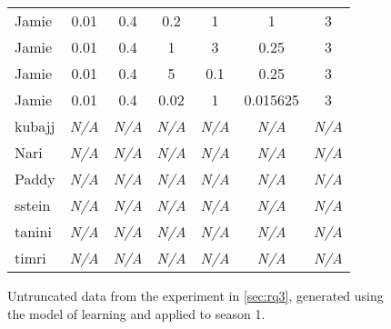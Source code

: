\begin{figure}[h]
\begin{tabular}{@{}l c c c c c c@{}}
Jamie & 0.01 & 0.4 & 0.2 & 1 & 1 & 3 \\
Jamie & 0.01 & 0.4 & 1 & 3 & 0.25 & 3 \\
Jamie & 0.01 & 0.4 & 5 & 0.1 & 0.25 & 3 \\
Jamie & 0.01 & 0.4 & 0.02 & 1 & 0.015625 & 3 \\
kubajj & \emph{N/A} & \emph{N/A} & \emph{N/A} & \emph{N/A} & \emph{N/A} & \emph{N/A} \\
Nari & \emph{N/A} & \emph{N/A} & \emph{N/A} & \emph{N/A} & \emph{N/A} & \emph{N/A} \\
Paddy & \emph{N/A} & \emph{N/A} & \emph{N/A} & \emph{N/A} & \emph{N/A} & \emph{N/A} \\
sstein & \emph{N/A} & \emph{N/A} & \emph{N/A} & \emph{N/A} & \emph{N/A} & \emph{N/A} \\
tanini & \emph{N/A} & \emph{N/A} & \emph{N/A} & \emph{N/A} & \emph{N/A} & \emph{N/A} \\
timri & \emph{N/A} & \emph{N/A} & \emph{N/A} & \emph{N/A} & \emph{N/A} & \emph{N/A} \\
\bottomrule
    \end{tabular}
    \caption{Untruncated data from the experiment in \cref{sec:rq3}, generated using the \aspectoriented model of learning and applied to season 1.}
    \label{complete_exp2_result_table}
  
\end{figure}